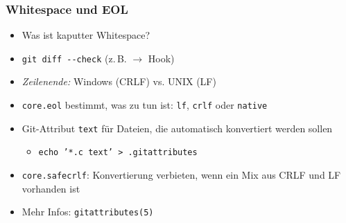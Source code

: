 \documentclass{beamer}
\begin{document}
\begin{frame}
\frametitle{Whitespace und EOL}

\begin{itemize}
	\item Was ist kaputter Whitespace?
	\item \texttt{git diff -{}-check} (z.\,B. $\rightarrow$ Hook)
\end{itemize}

\begin{itemize}
	\item \emph{Zeilenende:} Windows (CRLF) vs. UNIX (LF)
	\item \texttt{core.eol} bestimmt, was zu tun ist: \texttt{lf}, \texttt{crlf} oder \texttt{native}
	\item Git-Attribut \texttt{text} für Dateien, die automatisch konvertiert werden sollen
\begin{itemize}
	\item \texttt{echo '*.c text' > .gitattributes}
\end{itemize}
	\item \texttt{core.safecrlf}: Konvertierung verbieten, wenn ein Mix aus CRLF und LF vorhanden ist
	\item Mehr Infos: \texttt{gitattributes(5)}
\end{itemize}
\end{frame}
\end{document}
